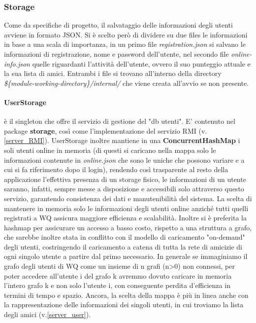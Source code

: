 \documentclass{article}
\begin{document}

    \subsubsection{Storage}\label{server_storage}
    Come da specifiche di progetto, il salvataggio delle informazioni degli utenti avviene in formato JSON. Si è scelto però di dividere su due files le informazioni in base a una scala di importanza, in un primo file \emph{registration.json} si salvano le informazioni di registrazione, nome e password dell'utente, nel secondo file \emph{online-info.json} quelle riguardanti l'attività dell'utente, ovvero il suo punteggio attuale e la sua lista di amici. Entrambi i file si trovano all'interno della directory \emph{\$\{module-working-directory\}/internal/} che viene creata all'avvio se non presente.
    \newline
    \paragraph{UserStorage} è il singleton che offre il servizio di gestione del "db utenti". E' contenuto nel package \textbf{storage}, così come l'implementazione del servizio RMI (v. \ref{server_RMI}). UserStorage inoltre mantiene in una \textbf{ConcurrentHashMap} i soli utenti online in memoria (di questi si caricano nella mappa solo le informazioni contenute in \textit{online.json} che sono le uniche che possono variare e a cui si fa riferimento dopo il login), rendendo così trasparente al resto della applicazione l'effettiva presenza di un storage fisico, le informazioni di un utente saranno, infatti, sempre messe a disposizione e accessibili solo attraverso questo servizio, garantendo consistenza dei dati e manutenibilità del sistema. La scelta di mantenere in memoria solo le informazioni degli utenti online anziché tutti quelli registrati a WQ assicura maggiore efficienza e scalabilità. Inoltre si è preferita la hashmap per assicurare un accesso a basso costo, rispetto a una struttura a grafo, che sarebbe inoltre stata in conflitto con il modello di caricamento "on-demand" degli utenti, costringendo il caricamento a catena di tutta la rete di amicizie di ogni singolo utente a partire dal primo necessario. In generale se immaginiamo il grafo degli utenti di WQ come un insieme di n grafi (n>0) non connessi, per poter accedere all'utente i del grafo k avremmo dovuto caricare in memoria l'intero grafo k e non solo l'utente i, con conseguente perdita d'efficienza in termini di tempo e spazio. Ancora, la scelta della mappa è più in linea anche con la rappresentazione delle informazioni dei singoli utenti, in cui troviamo la lista degli amici (v.\ref{server_user}).
\end{document}
